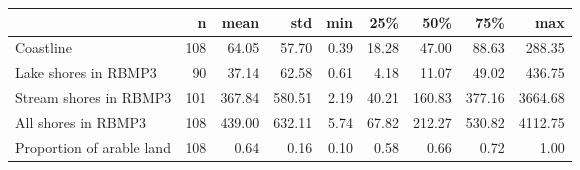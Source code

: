 \begin{tabular}{lrrrrrrrr}
\toprule
 & n & mean & std & min & 25\% & 50\% & 75\% & max \\
\midrule
Coastline & 108 & 64.05 & 57.70 & 0.39 & 18.28 & 47.00 & 88.63 & 288.35 \\
Lake shores in RBMP3 & 90 & 37.14 & 62.58 & 0.61 & 4.18 & 11.07 & 49.02 & 436.75 \\
Stream shores in RBMP3 & 101 & 367.84 & 580.51 & 2.19 & 40.21 & 160.83 & 377.16 & 3664.68 \\
All shores in RBMP3 & 108 & 439.00 & 632.11 & 5.74 & 67.82 & 212.27 & 530.82 & 4112.75 \\
Proportion of arable land & 108 & 0.64 & 0.16 & 0.10 & 0.58 & 0.66 & 0.72 & 1.00 \\
\bottomrule
\end{tabular}
